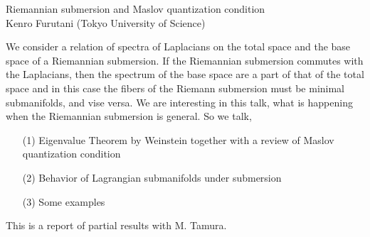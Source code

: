 \documentclass[a4paper,reqno,12pt]{article}
\theoremstyle{plain}
\theoremstyle{definition}
\theoremstyle{remark}
\begin{document}
\begin{center}
\begin{Large}
Riemannian submersion and Maslov quantization condition
\vspace{12pt}
\\
Kenro Furutani (Tokyo University of Science)
\end{Large}
\end{center}
%
%
\par
We consider a relation of spectra of Laplacians on the total space and the base space
of a Riemannian submersion. If the Riemannian submersion  commutes with the Laplacians, then the spectrum of the base space are a part of that of the total space and in this case the fibers of the Riemann submersion must be minimal submanifolds, and vise versa. We are interesting in this talk, what is happening when the  Riemannian  submersion is general. So we talk, 

\begin{itemize}
\item[(1)] 
Eigenvalue Theorem by Weinstein together with  a review of Maslov quantization condition
\item[(2)] 
Behavior of Lagrangian submanifolds under submersion
\item[(3)] 
Some examples
\end{itemize}

This is a report of partial results with M. Tamura.
%
%
%
%
\end{document}
